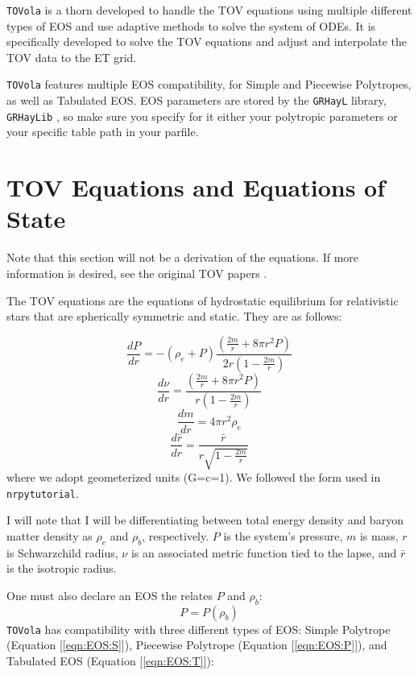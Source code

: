 {\tt TOVola} is a thorn developed to handle the TOV equations using multiple different types of EOS and use adaptive methods to solve the system of ODEs. It is specifically developed to solve the TOV equations and adjust and interpolate the TOV data to the ET grid.

{\tt TOVola} features multiple EOS compatibility, for Simple and Piecewise Polytropes, as well as Tabulated EOS. EOS parameters are stored by the {\tt GRHayL} library, {\tt GRHayLib} \cite{GRHayL}, so make sure you specify for it either your polytropic parameters or your specific table path in your parfile.

\section{TOV Equations and Equations of State}

Note that this section will not be a derivation of the equations. If more information is desired, see the original TOV papers \cite{Tolman, OppVol}.

The TOV equations are the equations of hydrostatic equilibrium for relativistic stars that are spherically symmetric and static. They are as follows:

\begin{equation}\label{eqn:TOVdP}
\frac{dP}{dr} = -(\rho_e+P)\frac{(\frac{2m}{r}+8\pi r^2P)}{2r(1-\frac{2m}{r})}
\end{equation}
\begin{equation}\label{eqn:TOVdnu}
\frac{d\nu}{dr} = \frac{(\frac{2m}{r}+8\pi r^2P)}{r(1-\frac{2m}{r})}
\end{equation}
\begin{equation}\label{eqn:TOVdM}
\frac{dm}{dr} = 4\pi r^2 \rho_e
\end{equation}
\begin{equation}\label{eqn:TOVdrbar}
\frac{d\bar{r}}{dr} = \frac{\bar{r}}{r\sqrt{1-\frac{2m}{r}}}
\end{equation}
where we adopt geometerized units (G=c=1). We followed the form used in {\tt nrpytutorial}.\cite{NRpy}

I will note that I will be differentiating between total energy density and baryon matter density as $\rho_e$ and $\rho_b$, respectively. $P$ is the system's pressure, $m$ is mass, $r$ is Schwarzchild radius, $\nu$ is an associated metric function tied to the lapse, and $\bar{r}$ is the isotropic radius.

One must also declare an EOS the relates $P$ and $\rho_b$:
\begin{equation}\label{eqn:EOS}
P=P(\rho_b)
\end{equation}
{\tt TOVola} has compatibility with three different types of EOS: Simple Polytrope (Equation [\ref{eqn:EOS:S}]), Piecewise Polytrope (Equation [\ref{eqn:EOS:P}]), and Tabulated EOS (Equation [\ref{eqn:EOS:T}]):

